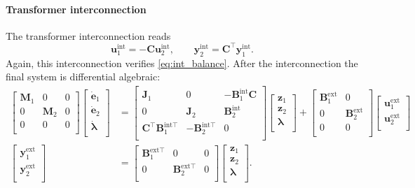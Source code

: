 \documentclass{svjour3}                     %
\begin{document}
\paragraph{Transformer interconnection}
The transformer interconnection reads
\begin{equation*}
\bm{u}_1^{\text{int}} = -\bm{C} \bm{u}_2^{\text{int}}, \qquad
\bm{y}_2^{\text{int}} = \bm{C}^\top \bm{y}_1^{\text{int}}.
\end{equation*}
Again, this interconnection verifies \eqref{eq:int_balance}. After the interconnection the final system is differential algebraic:
\begin{align*}
\begin{bmatrix}
\bm{M}_1 & 0 & 0 \\ 
0 & \bm{M}_2 & 0 \\
0 & 0 & 0 \\
\end{bmatrix}
\begin{bmatrix}
\dot{\bm{e}}_1 \\ \dot{\bm{e}}_2 \\ \dot{\bm{\lambda}} \\
\end{bmatrix} &= 
\begin{bmatrix}
\bm{J}_1 & 0 & -\bm{B}_1^{\text{int}} \bm{C} \\ 
0 & \bm{J}_2 & \bm{B}_2^{\text{int}} \\
\bm{C}^\top \bm{B}_1^{\text{int} \top} & - \bm{B}_2^{\text{int} \top} & 0 \\
\end{bmatrix}
\begin{bmatrix}
\bm{z}_1 \\ 
\bm{z}_2 \\
\bm{\lambda} \\
\end{bmatrix}+ 
\begin{bmatrix}
\bm{B}_1^{\text{ext}} & 0 \\ 0 & \bm{B}_2^{\text{ext}} \\ 0 & 0 \\
\end{bmatrix} 
\begin{bmatrix}
\bm{u}_1^{\text{ext}} \\ 
\bm{u}_2^{\text{ext}} \\
\end{bmatrix} \\
\begin{bmatrix}
\bm{y}_1^{\text{ext}} \\ \bm{y}_2^{\text{ext}} \\
\end{bmatrix}  &= \begin{bmatrix}
\bm{B}_1^{\text{ext} \top} & 0 & 0 \\
0 & \bm{B}_2^{\text{ext} \top} & 0 \\
\end{bmatrix} \begin{bmatrix}
\bm{z}_1 \\ 
\bm{z}_2 \\
\bm{\lambda} \\
\end{bmatrix}.
\end{align*}
\end{document}
